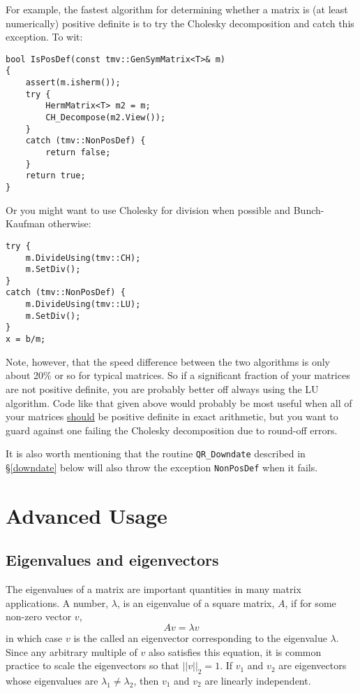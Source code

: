 \documentclass[twoside,letterpaper,11pt]{article}
\renewcommand{\tt}[1]{{\texttt {#1}}}
\begin{document}
For example, the fastest algorithm for determining whether a matrix is 
(at least numerically) positive definite is to try the Cholesky decomposition
and catch this exception.  To wit:
\begin{verbatim}
bool IsPosDef(const tmv::GenSymMatrix<T>& m)
{
    assert(m.isherm());
    try {
        HermMatrix<T> m2 = m;
        CH_Decompose(m2.View());
    }    
    catch (tmv::NonPosDef) {
        return false;
    }
    return true;
}
\end{verbatim}
Or you might want to use Cholesky for division when possible and Bunch-Kaufman otherwise:
\begin{verbatim}
try {
    m.DivideUsing(tmv::CH);
    m.SetDiv();
}
catch (tmv::NonPosDef) {
    m.DivideUsing(tmv::LU);
    m.SetDiv();
}
x = b/m;
\end{verbatim}
Note, however, that the speed difference between the two algorithms is only about
20\% or so for typical matrices.  So if a significant fraction of your matrices are 
not positive definite, you are probably better off always using the LU algorithm.  
Code like that given above would probably be most useful when all of your 
matrices \underline{should} be positive definite in exact arithmetic, but you 
want to guard against one failing the Cholesky decomposition due to round-off
errors.

It is also worth mentioning that the routine \tt{QR\_Downdate} described in \S\ref{downdate}
below will also throw the exception \tt{NonPosDef} when it fails.


\newpage
\section{Advanced Usage}

\subsection{Eigenvalues and eigenvectors}

The eigenvalues of a matrix are important quantities in many matrix applications.
A number, $\lambda$, is an eigenvalue of a square matrix, $A$, if for some
non-zero vector $v$,
\begin{equation}
A v = \lambda v
\end{equation}
in which case $v$ is the called an eigenvector corresponding to the eigenvalue $\lambda$.
Since any arbitrary multiple of $v$ also satisfies this equation, it is common practice
to scale the eigenvectors so that $||v||_2 = 1$.
If $v_1$ and $v_2$ are eigenvectors whose eigenvalues are 
$\lambda_1 \neq \lambda_2$, then $v_1$ and $v_2$ are linearly independent.
\end{document}
